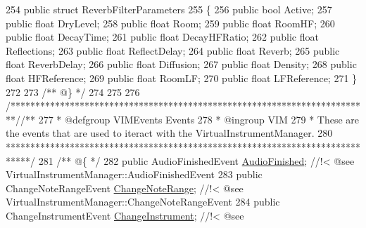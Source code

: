 \begin{DoxyCodeInclude}
254     \textcolor{keyword}{public} \textcolor{keyword}{struct }ReverbFilterParameters
255     \{
256         \textcolor{keyword}{public} \textcolor{keywordtype}{bool} Active;
257         \textcolor{keyword}{public} \textcolor{keywordtype}{float} DryLevel;
258         \textcolor{keyword}{public} \textcolor{keywordtype}{float} Room;
259         \textcolor{keyword}{public} \textcolor{keywordtype}{float} RoomHF;
260         \textcolor{keyword}{public} \textcolor{keywordtype}{float} DecayTime;
261         \textcolor{keyword}{public} \textcolor{keywordtype}{float} DecayHFRatio;
262         \textcolor{keyword}{public} \textcolor{keywordtype}{float} Reflections;
263         \textcolor{keyword}{public} \textcolor{keywordtype}{float} ReflectDelay;
264         \textcolor{keyword}{public} \textcolor{keywordtype}{float} Reverb;
265         \textcolor{keyword}{public} \textcolor{keywordtype}{float} ReverbDelay;
266         \textcolor{keyword}{public} \textcolor{keywordtype}{float} Diffusion;
267         \textcolor{keyword}{public} \textcolor{keywordtype}{float} Density;
268         \textcolor{keyword}{public} \textcolor{keywordtype}{float} HFReference;
269         \textcolor{keyword}{public} \textcolor{keywordtype}{float} RoomLF;
270         \textcolor{keyword}{public} \textcolor{keywordtype}{float} LFReference;
271     \}
272 \textcolor{comment}{}
273 \textcolor{comment}{    /** @\} */}
274 
275 
276     \textcolor{comment}{/*************************************************************************/}\textcolor{comment}{/** }
277 \textcolor{comment}{    * @defgroup VIMEvents Events}
278 \textcolor{comment}{    * @ingroup VIM}
279 \textcolor{comment}{    * These are the events that are used to iteract with the VirtualInstrumentManager.}
280 \textcolor{comment}{    *****************************************************************************/}\textcolor{comment}{}
281 \textcolor{comment}{    /** @\{ */}
282     \textcolor{keyword}{public} AudioFinishedEvent          \hyperlink{group___v_i_m_events_ga39ffa8215ab5c9ad46c563e2bd87c219}{AudioFinished}; \textcolor{comment}{//!< @see
       VirtualInstrumentManager::AudioFinishedEvent}
283 \textcolor{comment}{}    \textcolor{keyword}{public} ChangeNoteRangeEvent        \hyperlink{group___v_i_m_events_gab6fa99d08e8466406835b9fc4ff859f1}{ChangeNoteRange}; \textcolor{comment}{//!< @see
       VirtualInstrumentManager::ChangeNoteRangeEvent}
284 \textcolor{comment}{}    \textcolor{keyword}{public} ChangeInstrumentEvent       \hyperlink{group___v_i_m_events_ga1b9f12a73a5418ea5695d38b78c506c4}{ChangeInstrument}; \textcolor{comment}{//!< @see
}
\end{DoxyCodeInclude}
